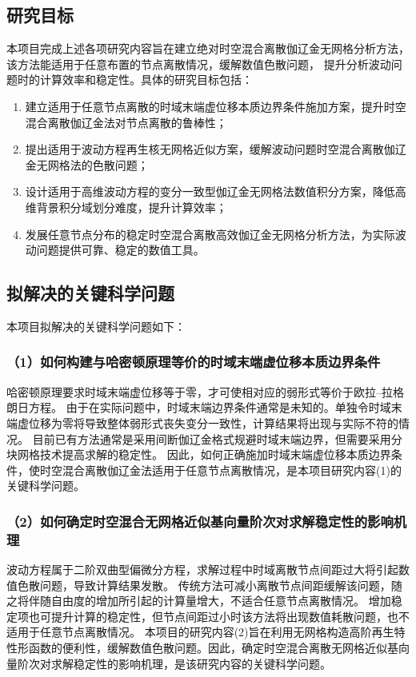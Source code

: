 \subsection{研究目标}
本项目完成上述各项研究内容旨在建立绝对时空混合离散伽辽金无网格分析方法，该方法能适用于任意布置的节点离散情况，缓解数值色散问题，
提升分析波动问题时的计算效率和稳定性。具体的研究目标包括：
\begin{enumerate}[label={\rmfamily (\theenumi)},left=24pt]
    \item 建立适用于任意节点离散的时域末端虚位移本质边界条件施加方案，提升时空混合离散伽辽金法对节点离散的鲁棒性；
    \item 提出适用于波动方程再生核无网格近似方案，缓解波动问题时空混合离散伽辽金无网格法的色散问题；
    \item 设计适用于高维波动方程的变分一致型伽辽金无网格法数值积分方案，降低高维背景积分域划分难度，提升计算效率；
    \item 发展任意节点分布的稳定时空混合离散高效伽辽金无网格分析方法，为实际波动问题提供可靠、稳定的数值工具。
\end{enumerate}

\subsection{拟解决的关键科学问题}

本项目拟解决的关键科学问题如下：

\subsubsection*{\bfseries （1）如何构建与哈密顿原理等价的时域末端虚位移本质边界条件}
哈密顿原理要求时域末端虚位移等于零，才可使相对应的弱形式等价于欧拉--拉格朗日方程。
由于在实际问题中，时域末端边界条件通常是未知的。单独令时域末端虚位移为零将导致整体弱形式丧失变分一致性，计算结果将出现与实际不符的情况。
目前已有方法通常是采用间断伽辽金格式规避时域末端边界，但需要采用分块网格技术提高求解的稳定性。
因此，如何正确施加时域末端虚位移本质边界条件，使时空混合离散伽辽金法适用于任意节点离散情况，是本项目研究内容(1)的关键科学问题。

\subsubsection*{\bfseries （2）如何确定时空混合无网格近似基向量阶次对求解稳定性的影响机理}
波动方程属于二阶双曲型偏微分方程，求解过程中时域离散节点间距过大将引起数值色散问题，导致计算结果发散。
传统方法可减小离散节点间距缓解该问题，随之将伴随自由度的增加所引起的计算量增大，不适合任意节点离散情况。
增加稳定项也可提升计算的稳定性，但节点间距过小时该方法将出现数值耗散问题，也不适用于任意节点离散情况。
本项目的研究内容(2)旨在利用无网格构造高阶再生特性形函数的便利性，缓解数值色散问题。因此，确定时空混合离散无网格近似基向量阶次对求解稳定性的影响机理，是该研究内容的关键科学问题。

